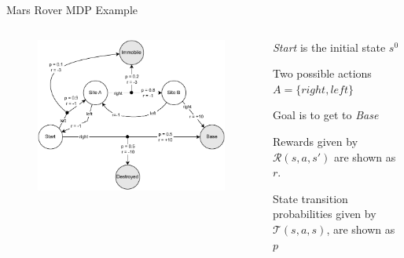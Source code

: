 \begin{frame}{Mars Rover MDP Example}
    \begin{columns}[onlytextwidth] 
    
      \begin{column}{0.5\textwidth}
        \begin{figure}
          \centering
          \includegraphics[width=\textwidth,height=.8\textheight,keepaspectratio]{images/chapter_2/mdp-rover.pdf}
          \label{fig:enter-label}
        \end{figure}
      \end{column}
    
      \begin{column}{0.5\textwidth}
        \blist
          \item \textit{Start} is the initial state \(s^0\)
          \item Two possible actions \(A = \{right, left\}\)
          \item Goal is to get to \textit{Base}
          \item Rewards given by $\mathcal{R}(s, a, s')$ are shown as $r$. 
          \item State transition probabilities given by $\mathcal{T}(s, a, s)$, are shown as $p$
        \elist
      \end{column}
    
    \end{columns}
\end{frame}

